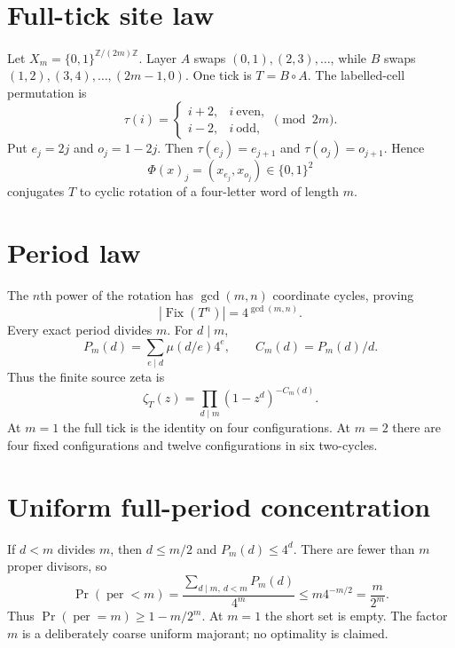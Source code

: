 \documentclass[10pt]{article}
\begin{document}
\section{Full-tick site law}
Let $X_m=\{0,1\}^{\mathbb Z/(2m)\mathbb Z}$.  Layer $A$ swaps
$(0,1),(2,3),\ldots$, while $B$ swaps
$(1,2),(3,4),\ldots,(2m-1,0)$.  One tick is $T=B\circ A$.
The labelled-cell permutation is
\[
\tau(i)=\begin{cases}i+2,&i\ \text{even},\\i-2,&i\ \text{odd},\end{cases}
\pmod {2m}.                                                   \tag{1}
\]
Put $e_j=2j$ and $o_j=1-2j$.  Then
$\tau(e_j)=e_{j+1}$ and $\tau(o_j)=o_{j+1}$.  Hence
\[
\Phi(x)_j=(x_{e_j},x_{o_j})\in\{0,1\}^2                    \tag{2}
\]
conjugates $T$ to cyclic rotation of a four-letter word of length $m$.

\section{Period law}
The $n$th power of the rotation has $\gcd(m,n)$ coordinate cycles, proving
\[
|\operatorname{Fix}(T^n)|=4^{\gcd(m,n)}.                    \tag{3}
\]
Every exact period divides $m$.  For $d\mid m$,
\[
P_m(d)=\sum_{e\mid d}\mu(d/e)4^e,\qquad C_m(d)=P_m(d)/d.    \tag{4}
\]
Thus the finite source zeta is
\[
\zeta_T(z)=\prod_{d\mid m}(1-z^d)^{-C_m(d)}.                \tag{5}
\]
At $m=1$ the full tick is the identity on four configurations.  At $m=2$
there are four fixed configurations and twelve configurations in six
two-cycles.

\section{Uniform full-period concentration}
If $d<m$ divides $m$, then $d\le m/2$ and $P_m(d)\le4^d$.  There are fewer
than $m$ proper divisors, so
\[
\Pr(\operatorname{per}<m)
=\frac{\sum_{d\mid m,\ d<m}P_m(d)}{4^m}
\le m4^{-m/2}=\frac{m}{2^m}.                               \tag{6}
\]
Thus $\Pr(\operatorname{per}=m)\ge1-m/2^m$.  At $m=1$ the short set is
empty.  The factor $m$ is a deliberately coarse uniform majorant; no
optimality is claimed.
\end{document}
